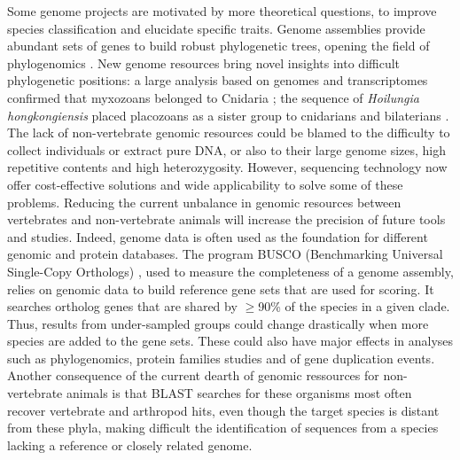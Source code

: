 Some genome projects are motivated by more theoretical questions, to improve species classification and elucidate specific traits. Genome assemblies provide abundant sets of genes to build robust phylogenetic trees, opening the field of phylogenomics \cite{phylogenomics}. New genome resources bring novel insights into difficult phylogenetic positions: a large analysis based on genomes and transcriptomes confirmed that myxozoans belonged to Cnidaria \cite{myxozoa_cnidaria}; the sequence of \textit{Hoilungia hongkongiensis} placed placozoans as a sister group to cnidarians and bilaterians \cite{hoilungia_hongkongiensis}.\\

The lack of non-vertebrate genomic resources could be blamed to the difficulty to collect individuals or extract pure DNA, or also to their large genome sizes, high repetitive contents and high heterozygosity. However, sequencing technology now offer cost-effective solutions and wide applicability to solve some of these problems. Reducing the current unbalance in genomic resources between vertebrates and non-vertebrate animals will increase the precision of future tools and studies. Indeed, genome data is often used as the foundation for different genomic and protein databases. The program BUSCO (Benchmarking Universal Single-Copy Orthologs) \cite{busco_evaluation}, used to measure the completeness of a genome assembly, relies on genomic data to build reference gene sets that are used for scoring. It searches ortholog genes that are shared by $\geq$90\% of the species in a given clade. Thus, results from under-sampled groups could change drastically when more species are added to the gene sets. These could also have major effects in analyses such as phylogenomics, protein families studies and of gene duplication events. Another consequence of the current dearth of genomic ressources for non-vertebrate animals is that BLAST \cite{blast} searches for these organisms most often recover vertebrate and arthropod hits, even though the target species is distant from these phyla, making difficult the identification of sequences from a species lacking a reference or closely related genome. \\


